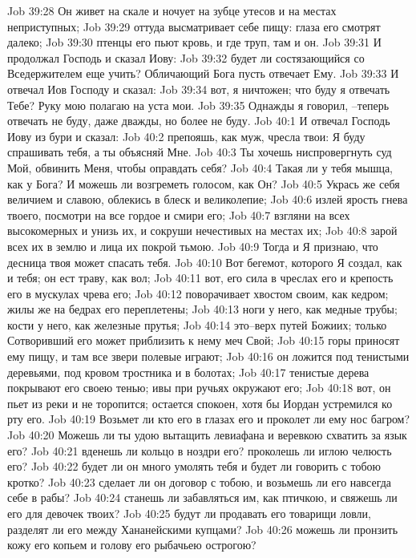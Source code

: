Job 39:28  Он живет на скале и ночует на зубце утесов и на местах неприступных;
Job 39:29  оттуда высматривает себе пищу: глаза его смотрят далеко;
Job 39:30  птенцы его пьют кровь, и где труп, там и он.
Job 39:31  И продолжал Господь и сказал Иову:
Job 39:32  будет ли состязающийся со Вседержителем еще учить? Обличающий Бога пусть отвечает Ему.
Job 39:33  И отвечал Иов Господу и сказал:
Job 39:34  вот, я ничтожен; что буду я отвечать Тебе? Руку мою полагаю на уста мои.
Job 39:35  Однажды я говорил, --теперь отвечать не буду, даже дважды, но более не буду.
Job 40:1  И отвечал Господь Иову из бури и сказал:
Job 40:2  препояшь, как муж, чресла твои: Я буду спрашивать тебя, а ты объясняй Мне.
Job 40:3  Ты хочешь ниспровергнуть суд Мой, обвинить Меня, чтобы оправдать себя?
Job 40:4  Такая ли у тебя мышца, как у Бога? И можешь ли возгреметь голосом, как Он?
Job 40:5  Укрась же себя величием и славою, облекись в блеск и великолепие;
Job 40:6  излей ярость гнева твоего, посмотри на все гордое и смири его;
Job 40:7  взгляни на всех высокомерных и унизь их, и сокруши нечестивых на местах их;
Job 40:8  зарой всех их в землю и лица их покрой тьмою.
Job 40:9  Тогда и Я признаю, что десница твоя может спасать тебя.
Job 40:10  Вот бегемот, которого Я создал, как и тебя; он ест траву, как вол;
Job 40:11  вот, его сила в чреслах его и крепость его в мускулах чрева его;
Job 40:12  поворачивает хвостом своим, как кедром; жилы же на бедрах его переплетены;
Job 40:13  ноги у него, как медные трубы; кости у него, как железные прутья;
Job 40:14  это--верх путей Божиих; только Сотворивший его может приблизить к нему меч Свой;
Job 40:15  горы приносят ему пищу, и там все звери полевые играют;
Job 40:16  он ложится под тенистыми деревьями, под кровом тростника и в болотах;
Job 40:17  тенистые дерева покрывают его своею тенью; ивы при ручьях окружают его;
Job 40:18  вот, он пьет из реки и не торопится; остается спокоен, хотя бы Иордан устремился ко рту его.
Job 40:19  Возьмет ли кто его в глазах его и проколет ли ему нос багром?
Job 40:20  Можешь ли ты удою вытащить левиафана и веревкою схватить за язык его?
Job 40:21  вденешь ли кольцо в ноздри его? проколешь ли иглою челюсть его?
Job 40:22  будет ли он много умолять тебя и будет ли говорить с тобою кротко?
Job 40:23  сделает ли он договор с тобою, и возьмешь ли его навсегда себе в рабы?
Job 40:24  станешь ли забавляться им, как птичкою, и свяжешь ли его для девочек твоих?
Job 40:25  будут ли продавать его товарищи ловли, разделят ли его между Хананейскими купцами?
Job 40:26  можешь ли пронзить кожу его копьем и голову его рыбачьею острогою?
